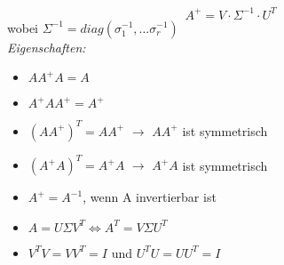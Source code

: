 \begin{equation*}
    A^+ = V \cdot \Sigma^{-1} \cdot U^T
\end{equation*}
wobei \(\Sigma^{-1}=diag(\sigma_1^{-1}, \hdots \sigma_r^{-1})\)\\

\textit{Eigenschaften:}
\begin{itemize}
    \item \(A  A^+  A = A\)
    \item \(A^+  A  A^+ = A^+\)
    \item \((A  A^+)^T = A  A^+\) \(\rightarrow\) \(A  A^+\) ist symmetrisch
    \item \((A^+  A)^T = A^+  A\) \(\rightarrow\) \(A^+  A\) ist symmetrisch
    \item \(A^+ = A^{-1}\), wenn A invertierbar ist
    \item \(A = U \Sigma V^T \Leftrightarrow A^T = V \Sigma U^T \)
    \item \(V^TV=VV^T=I\) und \(U^TU=UU^T=I\)
\end{itemize}